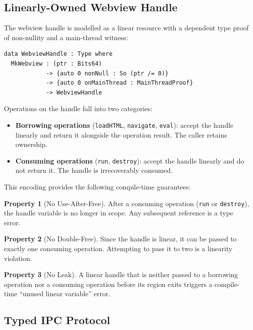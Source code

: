 \documentclass[11pt,a4paper]{article}
\theoremstyle{definition}
\newtheorem{property}{Property}[section]
\begin{document}
\subsection{Linearly-Owned Webview Handle}
\label{sec:webview}

The webview handle is modelled as a linear resource with a dependent
type proof of non-nullity and a main-thread witness:

\begin{lstlisting}[style=idris]
data WebviewHandle : Type where
  MkWebview : (ptr : Bits64)
            -> {auto 0 nonNull : So (ptr /= 0)}
            -> {auto 0 onMainThread : MainThreadProof}
            -> WebviewHandle
\end{lstlisting}

Operations on the handle fall into two categories:

\begin{itemize}[nosep]
  \item \textbf{Borrowing operations} (\texttt{loadHTML},
    \texttt{navigate}, \texttt{eval}): accept the handle linearly and
    return it alongside the operation result. The caller retains
    ownership.
  \item \textbf{Consuming operations} (\texttt{run}, \texttt{destroy}):
    accept the handle linearly and do not return it. The handle is
    irrecoverably consumed.
\end{itemize}

This encoding provides the following compile-time guarantees:

\begin{property}[No Use-After-Free]
After a consuming operation (\texttt{run} or \texttt{destroy}), the
handle variable is no longer in scope. Any subsequent reference is a
type error.
\end{property}

\begin{property}[No Double-Free]
Since the handle is linear, it can be passed to exactly one consuming
operation. Attempting to pass it to two is a linearity violation.
\end{property}

\begin{property}[No Leak]
A linear handle that is neither passed to a borrowing operation nor a
consuming operation before its region exits triggers a compile-time
``unused linear variable'' error.
\end{property}

\subsection{Typed IPC Protocol}
\label{sec:ipc}
\end{document}
